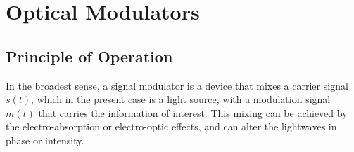 










\section{Optical Modulators}

\subsection{Principle of Operation}
In the broadest sense, a signal modulator is a device that mixes a carrier signal $s(t)$, which in the present case is a light source, with a modulation signal $m(t)$ that carries the information of interest. This mixing can be achieved by the electro-absorption or electro-optic effects, and can alter the lightwaves in phase or intensity. %

